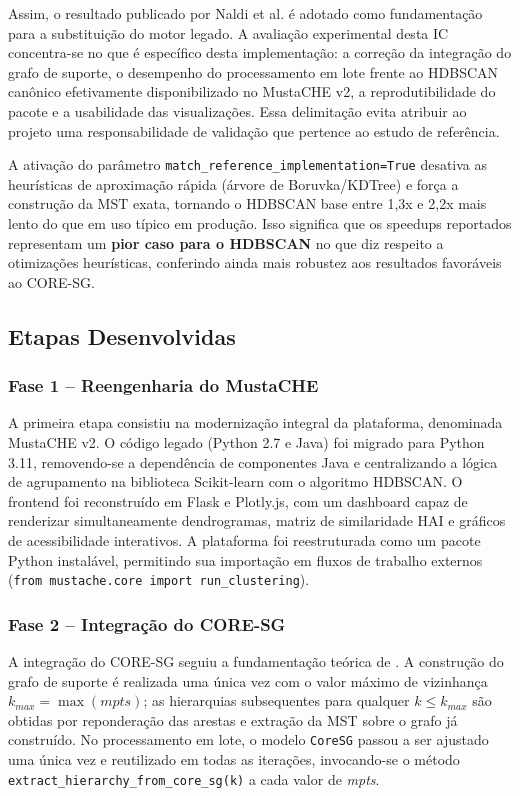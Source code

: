 \documentclass[12pt,a4paper,oneside]{article}
\newcommand{\textcite}{\citet}
\begin{document}
Assim, o resultado publicado por Naldi et al. é adotado como fundamentação para a substituição
do motor legado. A avaliação experimental desta IC concentra-se no que é específico desta
implementação: a correção da integração do grafo de suporte, o desempenho do processamento em
lote frente ao HDBSCAN canônico efetivamente disponibilizado no MustaCHE v2, a reprodutibilidade
do pacote e a usabilidade das visualizações. Essa delimitação evita atribuir ao projeto uma
responsabilidade de validação que pertence ao estudo de referência.

A ativação do parâmetro \texttt{match\_reference\_implementation=True} desativa as heurísticas
de aproximação rápida (árvore de Boruvka/KDTree) e força a construção da MST exata, tornando o
HDBSCAN base entre 1,3x e 2,2x mais lento do que em uso típico em produção. Isso significa que
os speedups reportados representam um \textbf{pior caso para o HDBSCAN} no que diz respeito a
otimizações heurísticas, conferindo ainda mais robustez aos resultados favoráveis ao CORE-SG.

\subsection{Etapas Desenvolvidas}

\subsubsection{Fase 1 -- Reengenharia do MustaCHE}

A primeira etapa consistiu na modernização integral da plataforma, denominada MustaCHE v2. O
código legado (Python 2.7 e Java) foi migrado para Python 3.11, removendo-se a dependência de
componentes Java e centralizando a lógica de agrupamento na biblioteca Scikit-learn com o
algoritmo HDBSCAN. O frontend foi reconstruído em Flask e Plotly.js, com um dashboard capaz de
renderizar simultaneamente dendrogramas, matriz de similaridade HAI e gráficos de
acessibilidade interativos. A plataforma foi reestruturada como um pacote Python instalável,
permitindo sua importação em fluxos de trabalho externos (\texttt{from mustache.core import
run\_clustering}).

\subsubsection{Fase 2 -- Integração do CORE-SG}

A integração do CORE-SG seguiu a fundamentação teórica de \textcite{naldi2022coresg}. A
construção do grafo de suporte é realizada uma única vez com o valor máximo de vizinhança
$k_{max} = \max(mpts)$; as hierarquias subsequentes para qualquer $k \le k_{max}$ são obtidas
por reponderação das arestas e extração da MST sobre o grafo já construído. No processamento em
lote, o modelo \texttt{CoreSG} passou a ser ajustado uma única vez e reutilizado em todas as
iterações, invocando-se o método \texttt{extract\_hierarchy\_from\_core\_sg(k)} a cada valor de
\textit{mpts}.
\end{document}
